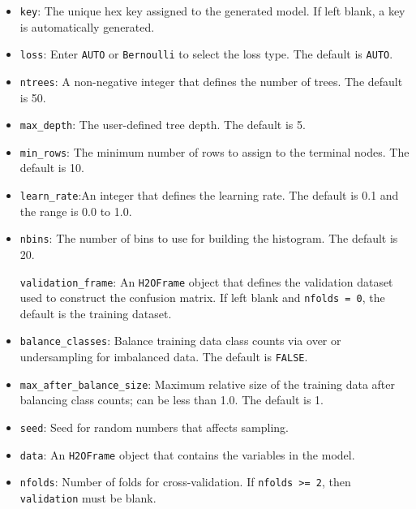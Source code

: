 \documentclass[11pt]{article}
\begin{document}
{\begin{itemize}
\item {\texttt{key}}: The unique hex key assigned to the generated model. If left blank, a key is automatically generated. 

\item {\texttt{loss}}: Enter {\texttt{AUTO}} or {\texttt{Bernoulli}} to select the loss type. The default is {\texttt{AUTO}}. 

\item {\texttt{ntrees}}: A non-negative integer that defines the number of trees. The default is 50. 

\item {\texttt{max_depth}}: The user-defined tree depth. The default is 5. 

\item {\texttt{min_rows}}: The minimum number of rows to assign to the terminal nodes. The default is 10. 

\item {\texttt{learn_rate}}:An integer that defines the learning rate. The default is 0.1 and the range is 0.0 to 1.0. 

\item {\texttt{nbins}}: The number of bins to use for building the histogram. The default is 20. 

{\texttt{validation_frame}}: An {\texttt{H2OFrame}} object that defines the validation dataset used to construct the confusion matrix. If left blank and {\texttt{nfolds = 0}}, the default is the training dataset.

\item {\texttt{balance_classes}}: Balance training data class counts via over or undersampling for imbalanced data. The default is {\texttt{FALSE}}. 

\item {\texttt{max_after_balance_size}}: Maximum relative size of the training data after balancing class counts; can be less than 1.0.  The default is 1. 

\item {\texttt{seed}}: Seed for random numbers that affects sampling. 

\item {\texttt{data}}: An {\texttt{H2OFrame}} object that contains the variables in the model. 

\item {\texttt{nfolds}}: Number of folds for cross-validation. If {\texttt{nfolds >= 2}}, then {\texttt{validation}} must be blank. 
\end{itemize}

}
\end{document}
